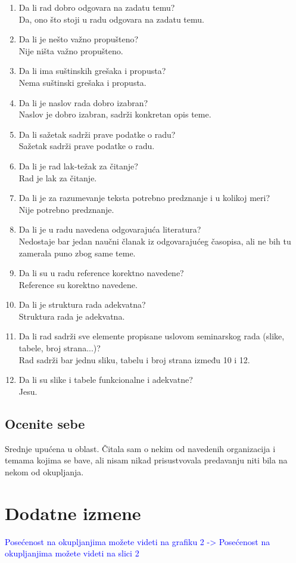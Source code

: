 \documentclass[a4paper]{report}
\newcommand{\odgovor}[1]{\textcolor{blue}{#1}}
\begin{document}
\begin{enumerate}
\item Da li rad dobro odgovara na zadatu temu?\\
Da, ono što stoji u radu odgovara na zadatu temu.
\item Da li je nešto važno propušteno?\\
Nije ništa važno propušteno.
\item Da li ima suštinskih grešaka i propusta?\\
Nema suštinski grešaka i propusta.
\item Da li je naslov rada dobro izabran?\\
Naslov je dobro izabran, sadrži konkretan opis teme.
\item Da li sažetak sadrži prave podatke o radu?\\
Sažetak sadrži prave podatke o radu.
\item Da li je rad lak-težak za čitanje?\\
Rad je lak za čitanje.
\item Da li je za razumevanje teksta potrebno predznanje i u kolikoj meri?\\
Nije potrebno predznanje.
\item Da li je u radu navedena odgovarajuća literatura?\\
Nedostaje bar jedan naučni članak iz odgovarajućeg časopisa, ali ne bih tu zamerala puno zbog same teme.
\odgovor{} %
\item Da li su u radu reference korektno navedene?\\
Reference su korektno navedene.
\item Da li je struktura rada adekvatna?\\
Struktura rada je adekvatna.
\item Da li rad sadrži sve elemente propisane uslovom seminarskog rada (slike, tabele, broj strana...)?\\
Rad sadrži bar jednu sliku, tabelu i broj strana između 10 i 12.
\item Da li su slike i tabele funkcionalne i adekvatne?\\
Jesu.
\end{enumerate}

\section{Ocenite sebe}
Srednje upućena u oblast. Čitala sam o nekim od navedenih organizacija i temama kojima se bave, ali nisam nikad prisustvovala predavanju niti  bila na nekom od okupljanja.


\chapter{Dodatne izmene}
\odgovor{Posećenost na okupljanjima možete videti na grafiku 2 -> Posećenost na okupljanjima možete videti na slici 2}
\end{document}
